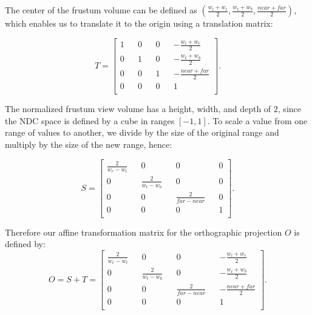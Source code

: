 \documentclass[cic,tc,english]{iiufrgs}
\begin{document}
The center of the frustum volume can be defined as $(\frac{w_l + w_r}{2}, \frac{w_t + w_b}{2}, \frac{near + far}{2})$, which enables us to translate it to the origin using a translation matrix:

\begin{equation}
    T=
    \begin{bmatrix}
        1 && 0 && 0 && -\frac{w_l + w_r}{2}  \\
        0 && 1 && 0 && -\frac{w_t + w_b}{2}  \\
        0 && 0 && 1 && -\frac{near + far}{2} \\
        0 && 0 && 0 && 1                     \\
    \end{bmatrix}
    .
\end{equation}

The normalized frustum view volume has a height, width, and depth of $2$, since the NDC space is defined by a cube in ranges $[-1, 1]$. To scale a value from one range of values to another, we divide by the size of the original range and multiply by the size of the new range, hence:

\begin{equation}
    S=
    \begin{bmatrix}
        \frac{2}{w_r - w_l} && 0 && 0 && 0  \\
        0 && \frac{2}{w_t - w_b} && 0 && 0  \\
        0 && 0 && \frac{2}{far - near} && 0 \\
        0 && 0 && 0 && 1                    \\
    \end{bmatrix}
    .
\end{equation}

Therefore our affine transformation matrix for the orthographic projection $O$ is defined by:
\begin{equation}
    O=S + T=
    \begin{bmatrix}
        \frac{2}{w_r - w_l} && 0 && 0 && -\frac{w_l + w_r}{2}   \\
        0 && \frac{2}{w_t - w_b} && 0 && -\frac{w_t + w_b}{2}   \\
        0 && 0 && \frac{2}{far - near} && -\frac{near + far}{2} \\
        0 && 0 && 0 && 1                                        \\
    \end{bmatrix}
    .
\end{equation}
\end{document}
